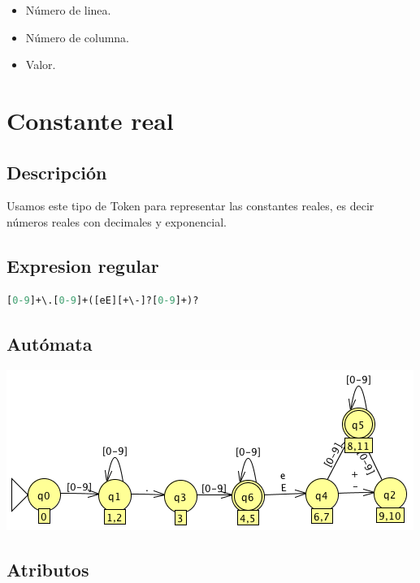             \begin{itemize}
                \item Número de linea.
                \item Número de columna.
                \item Valor.
            \end{itemize}

            \hfill
            \clearpage
            
            
            
            
	\section{Constante real}

        \subsection{Descripción}

            Usamos este tipo de Token para representar las constantes reales, es decir números reales con decimales y exponencial.

        \subsection{Expresion regular}

            \begin{lstlisting}[language=Perl]
[0-9]+\.[0-9]+([eE][+\-]?[0-9]+)?
            \end{lstlisting}

        \subsection{Autómata}

            \includegraphics[scale=.7]{../Design/jflap/Constante_real.png}

        \subsection{Atributos}

